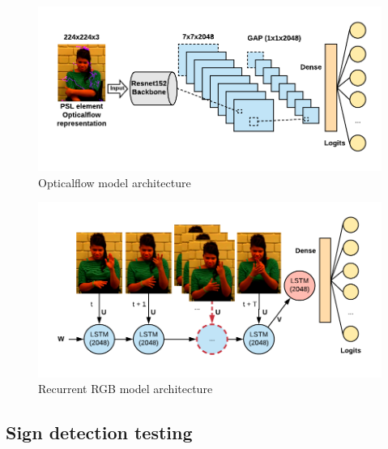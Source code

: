 \documentclass[twocolumn,conference]{article}
\begin{document}
\begin{figure}[hbt!]
\includegraphics[width=\linewidth]{images/opticalflow-model-architecture.png}
\caption{Opticalflow model architecture}
\label{fig:opticalflow-two}
\end{figure}

\begin{figure}[hbt!]
\includegraphics[width=\linewidth]{images/recurrent-rgb-model-architecture.png}
\caption{Recurrent RGB model architecture}
\label{fig:opticalflow-two}
\end{figure}

\subsection{Sign detection testing}\label{new-videos-testing}
\end{document}

